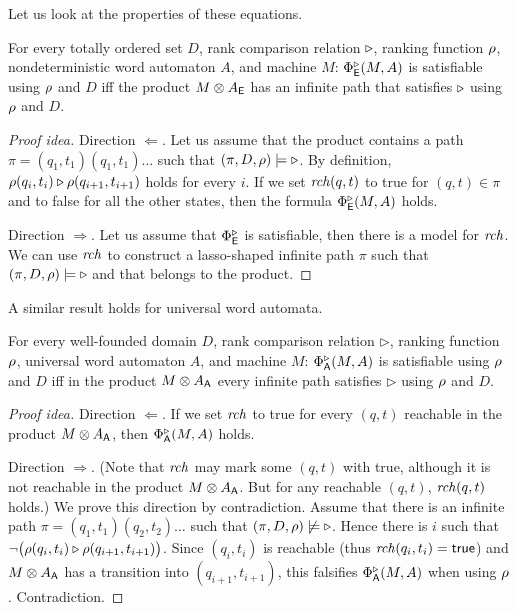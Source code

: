 Let us look at the properties of these equations.

\begin{lemma}\label{le:nondet-eq}
For every totally ordered set $D$,
rank comparison relation $\triangleright$,
ranking function $\rho$,
nondeterministic word automaton $A$, and machine $M$:
  $\Phi^{\triangleright}_{\operatorname{\mathsf{E}}}(M,A)$ is satisfiable using $\rho$ and $D$
  iff
  the product $M \otimes A_{\operatorname{\mathsf{E}}}$
  has an infinite path that satisfies $\triangleright$ using $\rho$ and $D$.
\end{lemma}
\begin{proof}[Proof idea]
Direction $\Leftarrow$.
Let us assume that the product contains a path $\pi=(q_1,t_1) (q_1,t_1)\dots$ such that $(\pi,D,\rho) \models \triangleright$.
By definition, $\rho(q_i,t_i)\triangleright\rho(q_{i+1},t_{i+1})$ holds for every $i$.
If we set $\mathit{rch}(q,t)$ to true for $(q,t) \in \pi$ and to false for all the other states,
then the formula $\Phi^{\triangleright}_{\operatorname{\mathsf{E}}}(M,A)$ holds.

Direction $\Rightarrow$.
Let us assume that $\Phi^{\triangleright}_{\operatorname{\mathsf{E}}}$ is satisfiable,
then there is a model for $\mathit{rch}$.
We can use $\mathit{rch}$ to construct a lasso-shaped infinite path $\pi$
such that $(\pi,D,\rho) \models \triangleright$ and that belongs to the product.
\end{proof}
A similar result holds for universal word automata.
\begin{lemma}\label{le:universal-eq}
For every well-founded domain $D$,
rank comparison relation $\triangleright$,
ranking function $\rho$,
universal word automaton $A$, and machine $M$:
  $\Phi^{\triangleright}_{\operatorname{\mathsf{A}}}(M,A)$ is satisfiable using $\rho$ and $D$
  iff
  in the product $M \otimes A_{\operatorname{\mathsf{A}}}$
  every infinite path satisfies $\triangleright$ using $\rho$ and $D$.
\end{lemma}
\begin{proof}[Proof idea]
Direction $\Leftarrow$.
If we set $\mathit{rch}$ to true for every $(q,t)$ reachable in the product $M \otimes A_{\operatorname{\mathsf{A}}}$,
then $\Phi^{\triangleright}_{\operatorname{\mathsf{A}}}(M,A)$ holds.

Direction $\Rightarrow$.
(Note that $\mathit{rch}$ may mark some $(q,t)$ with true,
 although it is not reachable in the product $M \otimes A_{\operatorname{\mathsf{A}}}$.
 But for any reachable $(q,t)$, $\mathit{rch}(q,t)$ holds.)
We prove this direction by contradiction.
Assume that there is an infinite path $\pi = (q_1,t_1)(q_2,t_2)\dots$
such that $(\pi,D,\rho) \not\models \triangleright$.
Hence there is $i$ such that $\neg\big(\rho(q_i,t_i)\triangleright \rho(q_{i+1},t_{i+1})\big)$.
Since $(q_i,t_i)$ is reachable (thus $\mathit{rch}(q_i,t_i)=\textsf{true}$) and $M\otimes A_{\operatorname{\mathsf{A}}}$ has a transition into $(q_{i+1},t_{i+1})$,
this falsifies $\Phi^{\triangleright}_{\operatorname{\mathsf{A}}}(M,A)$ when using $\rho$.
Contradiction.
\end{proof}

